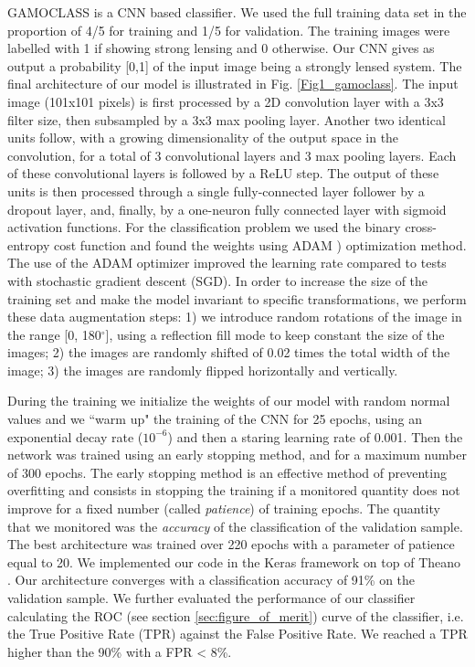 \documentclass{aa}
\newcommand{\degree}{^{\circ}}
\begin{document}
GAMOCLASS is a CNN based classifier.
We used the full training data set in the proportion of 4/5 for training and 1/5 for validation. The training images were labelled with 1 if showing strong lensing and 0 otherwise. Our CNN gives as output a probability [0,1] of the input image being a strongly lensed system.
The final architecture of our model is illustrated in Fig. \ref{Fig1_gamoclass}. The input image (101x101 pixels) is first processed by a 2D convolution layer with a 3x3 filter size, then subsampled by a 3x3 max pooling layer.  Another two identical units follow, with a growing dimensionality of the output space %
 in the convolution, for a total of 3 convolutional layers and 3 max
 pooling layers. Each of these convolutional layers is followed by a ReLU step. The output of these units is then processed through a single fully-connected layer follower by a dropout layer, and, finally, by a one-neuron fully connected layer with sigmoid activation functions. For the classification problem we used the binary cross-entropy cost function and found the weights  using ADAM \citep{Kingma_2014}) optimization method. The use of the ADAM optimizer improved the learning rate compared to tests with stochastic gradient descent (SGD).
In order to increase the size of the training set and make the model invariant to specific transformations, we perform these data augmentation steps:
1) we introduce random rotations of the image in the range [0, 180$\degree$], using a reflection fill mode to keep constant the size of the images;
2) the images are randomly shifted of 0.02 times the total width of the image;
3) the images are randomly flipped horizontally and vertically.

During the training we initialize the weights of our model with random normal values and we ``warm up" the training of the CNN for 25 epochs, using an exponential decay rate ($10^{-6}$) \citep{Huang_2016}  and then a staring learning rate of  0.001. Then the network was trained using an early stopping method, and for a maximum number of 300 epochs. The early stopping method is an effective method of preventing overfitting and consists in stopping the training if a monitored quantity does not improve for a fixed number (called \textit{patience}) of training epochs. The quantity that we monitored was the \textit{accuracy} of the classification of the validation sample. The best architecture was trained over 220 epochs with a parameter of patience equal to 20.
We implemented our code in the Keras framework \citep{Chollet_2015} on top of Theano \citep{Bastien_2012}.
Our architecture converges with a classification accuracy of 91\% on the validation sample. We further evaluated the performance of our classifier calculating the ROC (see section \ref{sec:figure_of_merit})  curve of the classifier, i.e. the True Positive Rate (TPR) against the False Positive Rate.  We reached a TPR higher than the 90\% with a FPR < 8\%.
\end{document}
